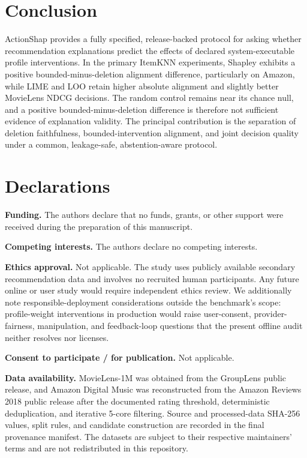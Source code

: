 \documentclass[pdflatex,sn-mathphys-num]{sn-jnl}
\theoremstyle{thmstyleone}
\theoremstyle{thmstyletwo}
\theoremstyle{thmstylethree}
\begin{document}
\section{Conclusion}
ActionShap provides a fully specified, release-backed protocol for asking whether recommendation explanations predict the effects of declared system-executable profile interventions. In the primary ItemKNN experiments, Shapley exhibits a positive bounded-minus-deletion alignment difference, particularly on Amazon, while LIME and LOO retain higher absolute alignment and slightly better MovieLens NDCG decisions. The random control remains near its chance null, and a positive bounded-minus-deletion difference is therefore not sufficient evidence of explanation validity. The principal contribution is the separation of deletion faithfulness, bounded-intervention alignment, and joint decision quality under a common, leakage-safe, abstention-aware protocol.



\backmatter

\section*{Declarations}
\textbf{Funding.} The authors declare that no funds, grants, or other support were received during the preparation of this manuscript.

\textbf{Competing interests.} The authors declare no competing interests.

\textbf{Ethics approval.} Not applicable. The study uses publicly available secondary recommendation data and involves no recruited human participants. Any future online or user study would require independent ethics review. We additionally note responsible-deployment considerations outside the benchmark's scope: profile-weight interventions in production would raise user-consent, provider-fairness, manipulation, and feedback-loop questions that the present offline audit neither resolves nor licenses.

\textbf{Consent to participate / for publication.} Not applicable.

\textbf{Data availability.} MovieLens-1M was obtained from the GroupLens public release, and Amazon Digital Music was reconstructed from the Amazon Reviews 2018 public release after the documented rating threshold, deterministic deduplication, and iterative 5-core filtering. Source and processed-data SHA-256 values, split rules, and candidate construction are recorded in the final provenance manifest. The datasets are subject to their respective maintainers' terms and are not redistributed in this repository.
\end{document}

